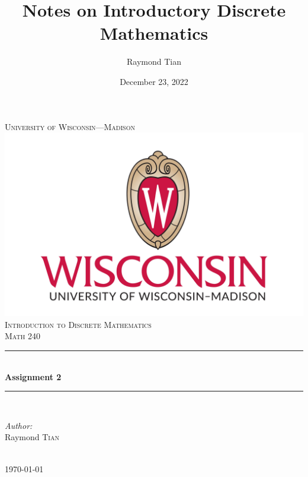 \documentclass{report}
\title{Notes on Introductory Discrete Mathematics}
\author{Raymond Tian}
\date{December 23, 2022}
\theoremstyle{mytheoremstyle}
\theoremstyle{mytheoremstyle}
\theoremstyle{myproblemstyle}
\begin{document}
\begin{titlepage}
\newcommand{\HRule}{\rule{\linewidth}{0.5mm}}  
\begin{center}
\textsc{\LARGE University of Wisconsin---Madison}\\[1.5cm] 
\includegraphics[scale=.1]{../../images/uw-logo.png}\\[1cm] 
\textsc{\Large Introduction to Discrete Mathematics}\\[0.5cm] 
\textsc{\large Math 240}\\[0.5cm] 

\HRule \\[0.4cm]
{ \huge \bfseries Assignment 2}\\[0.4cm] 
\HRule \\[1.5cm]

\begin{minipage}{0.4\textwidth}
\begin{flushleft} \large
\emph{Author:}\\
Raymond \textsc{Tian}\\ 
\end{flushleft}

\end{minipage}\\[2cm]

{\large \today}\\[2cm] 

\vfill 

\end{center}
\end{titlepage}

\pagestyle{empty}
\newpage
\pagestyle{fancy}
\newpage
\end{document}
